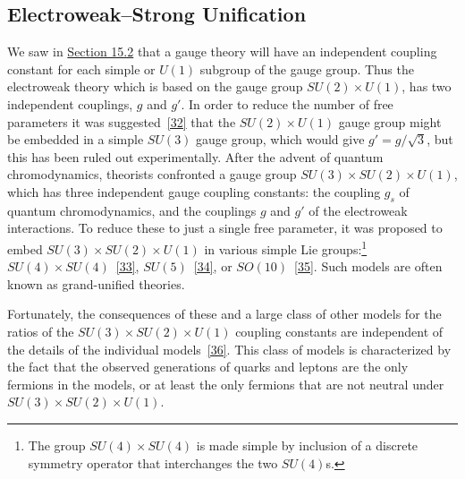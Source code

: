 
\subsection{Electroweak--Strong Unification}
\label{sec:21.5}

We saw in \hyperref[sec:15.2]{Section 15.2} that a gauge theory will have an independent coupling constant for each simple or $U(1)$ subgroup of the gauge group. Thus the electroweak theory which is based on the gauge group $SU(2)\times U(1)$, has two independent couplings, $g$ and $g'$. In order to reduce the number of free parameters it was suggested~\hyperref[ch21-ref-32]{[32]} that the $SU(2)\times U(1)$ gauge group might be embedded in a simple $SU(3)$ gauge group, which would give $g'=g/\sqrt{3}$, but this has been ruled out experimentally. After the advent of quantum chromodynamics, theorists confronted a gauge group $SU(3)\times SU(2)\times U(1)$, which has three independent gauge coupling constants: the coupling $g_s$ of quantum chromodynamics, and the couplings $g$ and $g'$ of the electroweak interactions. To reduce these to just a single free parameter, it was proposed to embed $SU(3)\times SU(2)\times U(1)$ in various simple Lie groups:\footnote{The group $SU(4)\times SU(4)$ is made simple by inclusion of a discrete symmetry operator that interchanges the two $SU(4)$s.} $SU(4)\times SU(4)$~\hyperref[ch21-ref-33]{[33]}, $SU(5)$~\hyperref[ch21-ref-34]{[34]}, or $SO(10)$~\hyperref[ch21-ref-35]{[35]}. Such models are often known as grand-unified theories.

Fortunately, the consequences of these and a large class of other models for the ratios of the $SU(3)\times SU(2)\times U(1)$ coupling constants are independent of the details of the individual models~\hyperref[ch21-ref-36]{[36]}. This class of models is characterized by the fact that the observed generations of quarks and leptons are the only fermions in the models, or at least the only fermions that are not neutral under $SU(3)\times SU(2)\times U(1)$.


